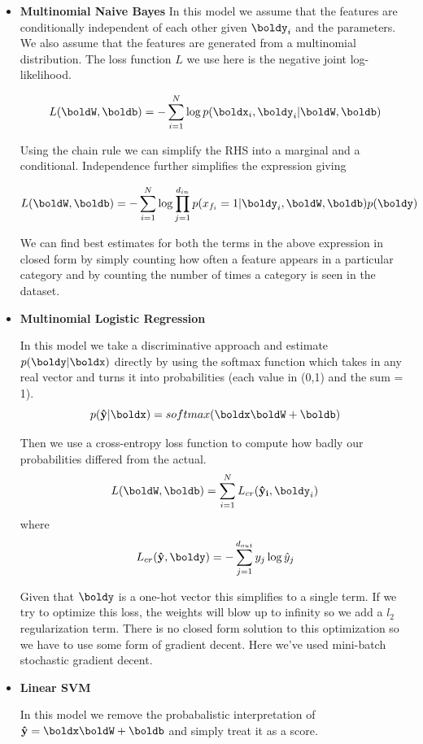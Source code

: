 \documentclass[11pt]{article}
\begin{document}
\begin{itemize}
  \item \textbf{Multinomial Naive Bayes}
  In this model we assume that the features are conditionally independent of each
  other given $\boldy_i$ and the parameters. We also assume that the features are
  generated from a multinomial distribution. The loss function $L$ we use here is the
  negative joint log-likelihood.

  $$L(\boldW,\boldb) = - \sum_{i=1}^N \log p(\boldx_i,\boldy_i | \boldW,\boldb)$$

  Using the chain rule we can simplify the RHS into a marginal and a conditional.
  Independence further simplifies the expression giving

  $$L(\boldW,\boldb) = - \sum_{i=1}^N \log \prod_{j=1}^{d_{in}}
    p(x_{f_i} = 1| \boldy_i, \boldW, \boldb) p(\boldy)$$

  We can find best estimates for both the terms in the above expression in closed
  form by simply counting how often a feature appears in a particular category
  and by counting the number of times a category is seen in the dataset.

  \item \textbf{Multinomial Logistic Regression}

  In this model we take a discriminative approach and estimate $p(\boldy|\boldx)$
  directly by using the softmax function which takes in any real vector and turns
  it into probabilities (each value in (0,1) and the sum = 1).
  $$ p(\bold{\hat{y}}|\boldx) = softmax(\boldx \boldW + \boldb) $$

  Then we use a cross-entropy loss function to compute how badly our probabilities
  differed from the actual.
  $$ L(\boldW, \boldb) = \sum_{i=1}^{N} L_{cr}(\bold{\hat{y}_i},\boldy_i) $$
  where
  $$ L_{cr}(\bold{\hat{y}},\boldy) = - \sum_{j=1}^{d_{out}} y_j \log \hat{y}_j $$

  Given that $\boldy$ is a one-hot vector this simplifies to a single term. If
  we try to optimize this loss, the weights will blow up to infinity so we add a
  $l_2$ regularization term. There is no closed form solution to this optimization
  so we have to use some form of gradient decent. Here we've used mini-batch
  stochastic gradient decent.

  \item \textbf{Linear SVM}

  In this model we remove the probabalistic interpretation of
  $\bold{\hat{y}} = \boldx \boldW + \boldb$ and simply treat it as a score.


\end{itemize}
\end{document}
